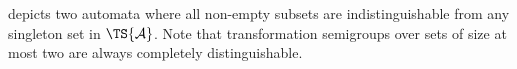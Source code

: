 \begin{example}
	depicts two automata where all non-empty subsets
	are indistinguishable from any singleton
	set in $\TS{\mathcal A}$.
	Note that transformation semigroups over sets of size at most two
	are always completely distinguishable.

\end{example}
